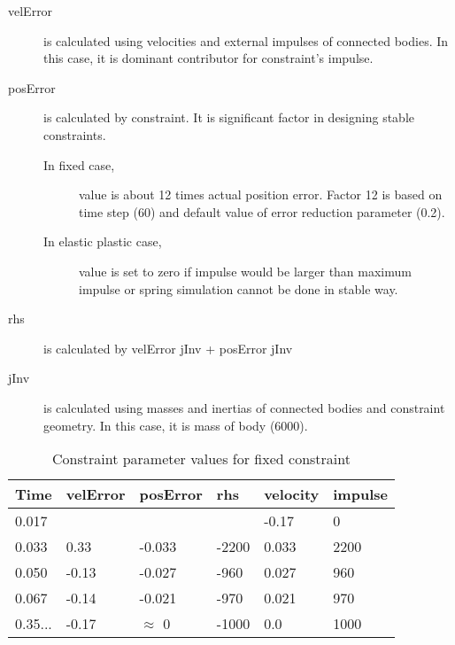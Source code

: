 \begin{description}
\item[velError] is calculated using velocities and external impulses of connected bodies. 
 In this case, it is dominant contributor for constraint's impulse.
\item[posError] is calculated by constraint. It is significant factor in designing stable constraints.
 \begin{description}
 \item[In fixed case,] value is about 12 times actual position error. Factor 12 is based on time step (60) 
 and default value of error reduction parameter (0.2).
 \item[In elastic plastic case,]  value is set to zero if impulse would be larger than maximum impulse or
spring simulation cannot be done in stable way.
 \end{description}
\item[rhs] is calculated by velError jInv + posError jInv
\item[jInv] is calculated using masses and inertias of connected bodies and constraint geometry. 
In this case, it is mass of body (6000).
\end{description}

\begin {table}[htb!]
\begin{center}
\begin{tabular}{|l| l| l|l|l|l|}
\hline
{\bf Time} & 
{\bf velError} & {\bf posError} & {\bf rhs} &
{\bf velocity} & 
{\bf impulse} \\  \hline
0.017 &  & & & -0.17 & 0 \\  \hline
0.033 &  0.33 & -0.033 & -2200 & 0.033 & 2200 \\  \hline
0.050 &  -0.13 & -0.027 & -960 & 0.027 & 960 \\  \hline
0.067 &  -0.14 & -0.021 & -970 & 0.021 & 970 \\  \hline
0.35... &  -0.17 & $\approx$ 0 & -1000 &0.0 & 1000 \\  \hline
\end {tabular}
\end{center}
\caption {Constraint parameter values for fixed constraint} \label{tab:fixedBlockValues} 
\end {table}


